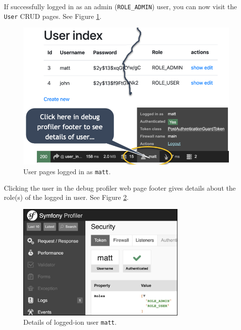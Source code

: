 \documentclass[a4paperpaper,openright]{book}
\begin{document}
If successfully logged in as an admin (\texttt{ROLE\_ADMIN}) user, you
can now visit the \texttt{User} CRUD pages. See Figure \ref{user_matt}.

\begin{figure}
\centering
\includegraphics[width=1\textwidth,height=\textheight]{./tex2pdf.-564b08cce17d66dc/84cffeb13f942d54d447415ae700cc1724cc61f3.png}
\caption{User pages logged in as \texttt{matt}. \label{user_matt}}
\end{figure}

Clicking the user in the debug profiler web page footer gives details
about the role(s) of the logged in user. See Figure
\ref{user_matt_details}.

\begin{figure}
\centering
\includegraphics[width=0.75\textwidth,height=\textheight]{./tex2pdf.-564b08cce17d66dc/728fb69456089104f63c0b8969fefd76c8ebde21.png}
\caption{Details of logged-ion user \texttt{matt}.
\label{user_matt_details}}
\end{figure}
\end{document}
